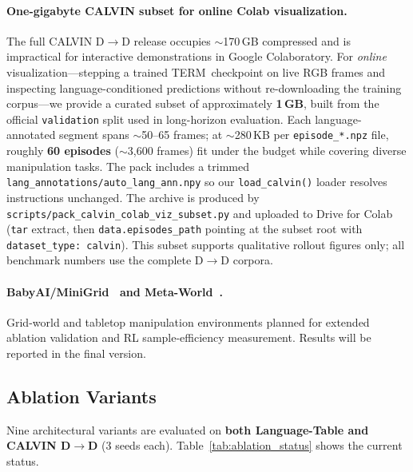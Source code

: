 \documentclass{article}
\newcommand{\modelname}{\textsc{TERM}\xspace}
\begin{document}
\paragraph{One-gigabyte CALVIN subset for online Colab visualization.}
The full CALVIN D$\to$D release occupies ${\sim}$170\,GB compressed and is
impractical for interactive demonstrations in Google Colaboratory.
For \emph{online} visualization---stepping a trained \modelname\ checkpoint on
live RGB frames and inspecting language-conditioned predictions without
re-downloading the training corpus---we provide a curated subset of
approximately \textbf{1\,GB}, built from the official \texttt{validation} split
used in long-horizon evaluation.
Each language-annotated segment spans ${\sim}$50--65 frames; at ${\sim}$280\,KB
per \texttt{episode\_*.npz} file, roughly \textbf{60 episodes}
(${\sim}$3{,}600 frames) fit under the budget while covering diverse
manipulation tasks.
The pack includes a trimmed \texttt{lang\_annotations/auto\_lang\_ann.npy} so our
\texttt{load\_calvin()} loader resolves instructions unchanged.
The archive is produced by
\texttt{scripts/pack\_calvin\_colab\_viz\_subset.py} and uploaded to Drive for
Colab (\texttt{tar} extract, then \texttt{data.episodes\_path} pointing at the
subset root with \texttt{dataset\_type: calvin}).
This subset supports qualitative rollout figures only; all benchmark numbers
use the complete D$\to$D corpora.

\paragraph{BabyAI/MiniGrid~\citep{chevalier2019babyai,minigrid} and
Meta-World~\citep{yu2020metaworld}.}
Grid-world and tabletop manipulation environments planned for extended
ablation validation and RL sample-efficiency measurement.
Results will be reported in the final version.

\subsection{Ablation Variants}
\label{sec:ablation_status}

Nine architectural variants are evaluated on \textbf{both Language-Table and
CALVIN D$\to$D} (3 seeds each).
Table~\ref{tab:ablation_status} shows the current status.
\end{document}
